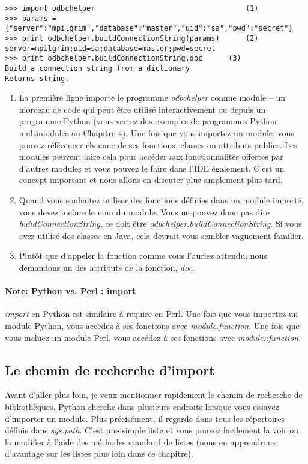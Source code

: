 \begin{lstlisting}
>>> import odbchelper                                   (1)
>>> params = {"server":"mpilgrim","database":"master","uid":"sa","pwd":"secret"}
>>> print odbchelper.buildConnectionString(params)      (2)
server=mpilgrim;uid=sa;database=master;pwd=secret
>>> print odbchelper.buildConnectionString.doc      (3)
Build a connection string from a dictionary
Returns string.
\end{lstlisting}

\begin{enumerate}
\item{La première ligne importe le programme \emph{odbchelper} comme module -- un morceau de code qui peut être utilisé interactivement ou depuis un programme Python (vous verrez des exemples de programmes Python multimodules au Chapitre 4). Une fois que vous importez un module, vous pouvez référencer chacune de ses fonctions, classes ou attributs publics.
Les modules peuvent faire cela pour accéder aux fonctionnalités offertes par d'autres modules et vous pouvez le faire dans l'IDE également. C'est un concept important et nous allons en discuter plus amplement plus tard.}
\item{Quand vous souhaitez utiliser des fonctions définies dans un module importé, vous devez inclure le nom du module. Vous ne pouvez donc pas dire \emph{buildConnectionString}, ce doit être \emph{odbchelper.buildConnectionString}. Si vous avez utilisé des classes en Java, cela devrait vous sembler vaguement familier.}
\item{Plutôt que d'appeler la fonction comme vous l'auriez attendu, nous demandons un des attributs de la fonction, \emph{doc.}}
\end{enumerate}

\paragraph*{Note: Python vs. Perl : import}
\emph{import} en Python est similaire à require en Perl. Une fois que vous importez un module Python, vous accédez à ses fonctions avec \emph{module.function}. Une fois que vous incluez un module Perl, vous accédez à ses fonctions avec \emph{module::function}.

\subsection{Le chemin de recherche d'import}
Avant d'aller plus loin, je veux mentionner rapidement le chemin de recherche de bibliothèques. Python cherche dans plusieurs endroits lorsque vous essayez d'importer un module. Plus précisément, il regarde dans tous les répertoires définis dans \emph{sys.path}. C'est une simple liste et vous pouvez facilement la voir ou la modifier à l'aide des méthodes standard de listes (nous en apprendrons d'avantage sur les listes plus loin dans ce chapitre).

